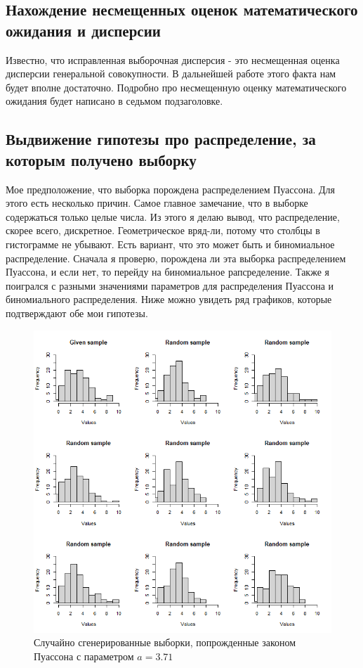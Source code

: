 \documentclass[14pt,a4paper]{scrartcl}
\theoremstyle{definition}
\theoremstyle{remark}
\theoremstyle{definition}
\theoremstyle{definition}
\begin{document}
\subsection{Нахождение несмещенных оценок математического ожидания и дисперсии}

Известно, что исправленная выборочная дисперсия - это несмещенная оценка дисперсии генеральной совокупности. В дальнейшей работе этого факта нам будет вполне достаточно. Подробно про несмещенную оценку математического ожидания будет написано в седьмом подзаголовке.

\subsection{Выдвижение гипотезы про распределение, за которым получено выборку}

Мое предположение, что выборка порождена распределением Пуассона. Для этого есть несколько причин. Самое главное замечание, что в выборке содержаться только целые числа. Из этого я делаю вывод, что распределение, скорее всего, дискретное. Геометрическое вряд-ли, потому что столбцы в гистограмме не убывают. Есть вариант, что это может быть и биномиальное распределение. Сначала я проверю, порождена ли эта выборка распределением Пуассона, и если нет, то перейду на биномиальное рапсределение. Также я поигрался с разными значениями параметров для распределения Пуассона и биномиального распределения. Ниже можно увидеть ряд графиков, которые подтверждают обе мои гипотезы.

\begin{figure}[H]
  \includegraphics[width=\linewidth]{RPlotPoiss.png}
  \caption{Случайно сгенерированные выборки, попрожденные законом Пуассона с параметром $a = 3.71$}
  \label{fig:image2}
\end{figure}
\end{document}
